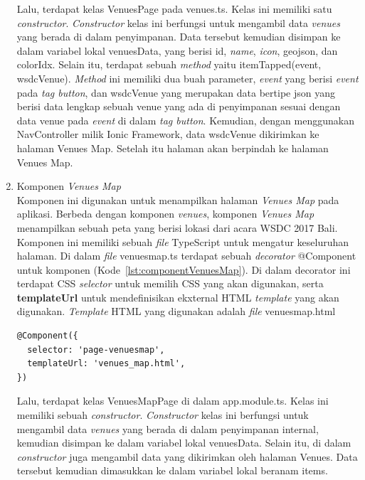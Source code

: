 \begin{enumerate}
	Lalu, terdapat kelas VenuesPage pada venues.ts. Kelas ini memiliki satu \textit{constructor}. \textit{Constructor} kelas ini berfungsi untuk mengambil data \textit{venues} yang berada di dalam penyimpanan. Data tersebut kemudian disimpan ke dalam variabel lokal venuesData, yang berisi id, \textit{name}, \textit{icon}, geojson, dan colorIdx. 
	Selain itu, terdapat sebuah \textit{method} yaitu itemTapped(event, wsdcVenue). \textit{Method} ini memiliki dua buah parameter, \textit{event} yang berisi \textit{event} pada \textit{tag button}, dan wsdcVenue yang merupakan data bertipe json yang berisi data lengkap sebuah venue yang ada di penyimpanan sesuai dengan data venue pada \textit{event} di dalam \textit{tag button}. Kemudian, dengan menggunakan NavController milik Ionic Framework, data wsdcVenue dikirimkan ke halaman Venues Map. Setelah itu halaman akan berpindah ke halaman Venues Map.
	
	\item Komponen \textit{Venues Map} \\
	Komponen ini digunakan untuk menampilkan halaman \textit{Venues Map} pada aplikasi. Berbeda dengan komponen \textit{venues}, komponen \textit{Venues Map} menampilkan sebuah peta yang berisi lokasi dari acara WSDC 2017 Bali. Komponen ini memiliki sebuah \textit{file} TypeScript untuk mengatur keseluruhan halaman. Di dalam \textit{file} venues\textunderscore map.ts terdapat sebuah \textit{decorator} @Component untuk komponen (Kode~\ref{lst:componentVenuesMap}). Di dalam decorator ini terdapat CSS \textit{selector} untuk memilih CSS yang akan digunakan, serta \textbf{templateUrl} untuk mendefinisikan ekxternal HTML \textit{template} yang akan digunakan. \textit{Template} HTML yang digunakan adalah \textit{file} venues\textunderscore map.html
	
\begin{lstlisting}[label={lst:componentVenuesMap}, caption=@Component pada venues\textunderscore map.ts]
@Component({
  selector: 'page-venuesmap',
  templateUrl: 'venues_map.html',
})
\end{lstlisting}	

	Lalu, terdapat kelas VenuesMapPage di dalam app.module.ts. Kelas ini memiliki sebuah \textit{constructor}. \textit{Constructor} kelas ini berfungsi untuk mengambil data \textit{venues} yang berada di dalam penyimpanan internal, kemudian disimpan ke dalam variabel lokal venuesData. Selain itu, di dalam \textit{constructor} juga mengambil data yang dikirimkan oleh halaman Venues. Data tersebut kemudian dimasukkan ke dalam variabel lokal beranam items. 
	

\end{enumerate}
